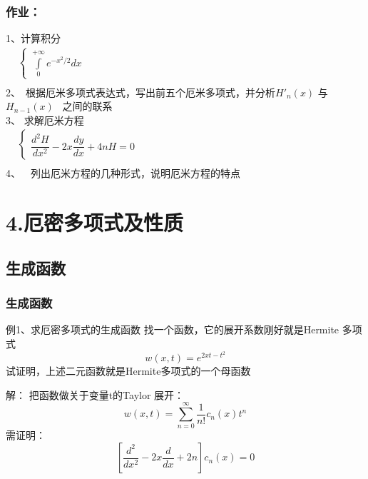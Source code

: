 \begin{frame}
	\frametitle{作业：}
	1、计算积分\\ 
	$\begin{array}{lllllllll}
		& \begin{cases}
			\int\limits_{0}^{+\infty} e^{-x^2 /2} dx
		\end{cases}\\	
	\end{array}$ \\ 
	2、 根据厄米多项式表达式，写出前五个厄米多项式，并分析$H'_n (x)$ 与$H_{n-1} (x)$  之间的联系\\
	3、 求解厄米方程\\ 
	$\begin{array}{lllllllll}
		& \begin{cases}
			\dfrac{d^2 H}{d x^2} -2x \dfrac{d y}{d x} +4n H =0 	
		\end{cases}\\	
	\end{array}$ \\ 
	4、  列出厄米方程的几种形式，说明厄米方程的特点
\end{frame}

\section{4.厄密多项式及性质}

\subsection{生成函数}

\begin{frame}
	\frametitle{ 生成函数 }
	\begin{exampleblock} { 例1、求厄密多项式的生成函数 }
		找一个函数，它的展开系数刚好就是Hermite 多项式
		 \begin{equation*}
			w(x,t)=e^{2xt-t^2}
		\end{equation*}
		试证明，上述二元函数就是Hermite多项式的一个母函数
	\end{exampleblock}
	\alert {解：}	把函数做关于变量t的Taylor 展开：
	\begin{equation*}
		w(x,t) =\sum_{n=0}^{\infty} \frac{1}{n!}  c_n(x) t^n
	\end{equation*}
	需证明：
	\begin{equation*}
		\left[  \frac{d^2}{dx^2} -2x\frac{d}{dx} +2n  \right] c_n(x)=0
	\end{equation*}
\end{frame}

